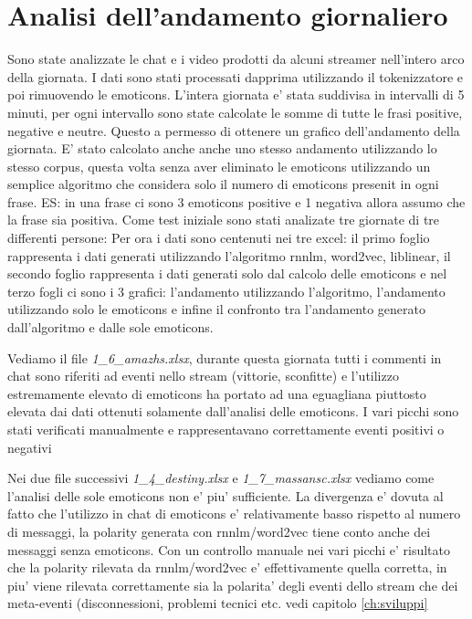 \documentclass[a4paper,11pt]{book}
\theoremstyle{definition}
\begin{document}
\chapter{Analisi dell'andamento giornaliero}
Sono state analizzate le chat e i video prodotti da alcuni streamer nell'intero arco della giornata. I dati sono stati processati dapprima utilizzando il tokenizzatore e poi rimuovendo le emoticons. L'intera giornata e' stata suddivisa in intervalli di 5 minuti, per ogni intervallo sono state calcolate le somme di tutte le frasi positive, negative e neutre. Questo a permesso di ottenere un grafico dell'andamento della giornata.
E' stato calcolato anche anche uno stesso andamento utilizzando lo stesso corpus, questa volta senza aver eliminato le emoticons utilizzando un semplice algoritmo che considera solo il numero di emoticons presenit in ogni frase. ES: in una frase ci sono 3 emoticons positive e 1 negativa allora assumo che la frase sia positiva.
Come test iniziale sono stati analizate tre giornate di tre differenti persone:
\newline
\newline
Per ora i dati sono centenuti nei tre excel: il primo foglio rappresenta i dati generati utilizzando l'algoritmo rnnlm, word2vec, liblinear, il secondo foglio rappresenta i dati generati solo dal calcolo delle emoticons e nel terzo fogli ci sono i 3 grafici: l'andamento utilizzando l'algoritmo, l'andamento utilizzando solo le emoticons e infine il confronto tra l'andamento generato dall'algoritmo e dalle sole emoticons.

Vediamo il file \emph{1\_6\_amazhs.xlsx}, durante questa giornata tutti i commenti in chat sono riferiti ad eventi nello stream (vittorie, sconfitte) e l'utilizzo estremamente elevato di emoticons ha portato ad una eguagliana piuttosto elevata dai dati ottenuti solamente dall'analisi delle emoticons. I vari picchi sono stati verificati manualmente e rappresentavano correttamente eventi positivi o negativi

Nei due file successivi \emph{1\_4\_destiny.xlsx} e \emph{1\_7\_massansc.xlsx} vediamo come l'analisi delle sole emoticons non e' piu' sufficiente. La divergenza e' dovuta al fatto che l'utilizzo in chat di emoticons e' relativamente basso rispetto al numero di messaggi, la polarity generata con rnnlm/word2vec tiene conto anche dei messaggi senza emoticons. Con un controllo manuale nei vari picchi e' risultato che la polarity rilevata da rnnlm/word2vec e' effettivamente quella corretta, in piu' viene rilevata correttamente sia la polarita' degli eventi dello stream che dei meta-eventi (disconnessioni, problemi tecnici etc. vedi capitolo \ref{ch:sviluppi}
\end{document}
